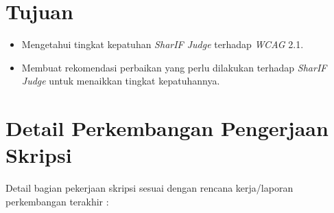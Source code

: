 \documentclass[a4paper,twoside]{article}
\begin{document}
\section{Tujuan}
\begin{itemize}
	\item Mengetahui tingkat kepatuhan \textit{SharIF Judge} terhadap \textit{WCAG} 2.1.
	\item Membuat rekomendasi perbaikan yang perlu dilakukan terhadap \textit{SharIF Judge} untuk menaikkan tingkat kepatuhannya.
\end{itemize} 

\section{Detail Perkembangan Pengerjaan Skripsi}
Detail bagian pekerjaan skripsi sesuai dengan rencana kerja/laporan perkembangan terakhir :
\end{document}
